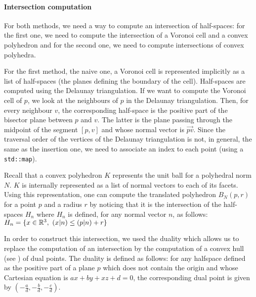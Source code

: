 \paragraph{Intersection computation}

For both methods, we need a way to compute an intersection of half-spaces: for
the first one, we need to compute the intersection of a Voronoi cell and a
convex polyhedron and for the second one, we need to compute intersections of
convex polyhedra.

For the first method, the naive one, a Voronoi cell is represented implicitly as
a list of half-spaces (the planes defining the boundary of the cell).
Half-spaces are computed using the Delaunay triangulation. If we want to compute
the Voronoi cell of $ p $, we look at the neighbours of $ p $ in the Delaunay
triangulation. Then, for every neighbour $ v $, the corresponding half-space is
the positive part of the bisector plane between $ p $ and $ v $. The latter is
the  plane passing through the midpoint of the segment $ [p, v] $ and whose
normal vector is $ \vec{pv} $. Since the traversal order of the vertices of the
Delaunay triangulation is not, in general, the same as the insertion one, we
need to associate an index to each point (using a \texttt{std::map}).

Recall that a convex polyhedron $ K $ represents the unit ball for a polyhedral
norm $ N $. $ K $ is internally represented as a list of normal vectors to each
of its facets. Using this representation, one can compute the translated
polyhedron $ B_N(p, r) $ for a point $ p $ and a radius $ r $ by noticing that
it is the intersection of the half-spaces $ H_n $ where $ H_n $ is defined, for
any normal vector $ n $, as follows: $ H_n = \{ x \in \mathbb{R}^3,~ (x | n) \leq (p |
n) + r \} $

In order to construct this intersection, we used the duality which allows us to
replace the computation of an intersection by the computation of a convex hull
(see \cite{preparata1979finding}) of dual points. The duality is defined as
follows: for any halfspace defined as the positive part of a plane $ p $ which
does not contain the origin and whose Cartesian equation is $ ax + by + xz + d =
0 $, the corresponding dual point is given by $ (-\frac{a}{d}, -\frac{b}{d},
-\frac{c}{d}) $.

